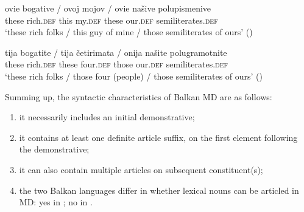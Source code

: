 \documentclass[output=paper]{langscibook}
\begin{document}

\ea \label{bogative}
\gll ovie bogative / ovoj mojov / ovie našive 	polupismenive \\
these rich.\textsc{def} { } this my.\textsc{def} { } these our.\textsc{def} semiliterates.\textsc{def} \\
\glt `these rich folks / this guy of mine / those semiliterates of ours'
\glt \hfill()


\ex \label{bogatite}
\gll tija bogatite / tija četirimata / onija našite 	polugramotnite \\
these rich.\textsc{def} { } these four.\textsc{def} { } those our.\textsc{def} semiliterates.\textsc{def} \\
\glt `these rich folks / those four (people) / those semiliterates of ours'
\glt \hfill()
\z

\noindent Summing up, the syntactic characteristics of Balkan  MD are as follows:

\begin{enumerate}
\item it necessarily includes an initial demonstrative;
\item it  contains at least one definite article suffix, on the first element following the demonstrative;
\item it can also contain multiple articles on subsequent constituent(s);
\item the two Balkan  languages differ in whether lexical nouns can be articled in MD: yes in ; no in .
\end{enumerate}
\end{document}
